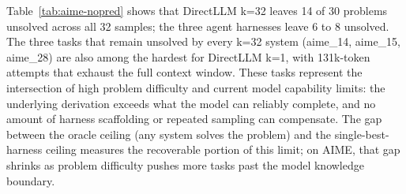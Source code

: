 Table~\ref{tab:aime-nopred} shows that DirectLLM k=32 leaves 14 of 30
problems unsolved across all 32 samples; the three agent harnesses leave
6 to 8 unsolved.
The three tasks that remain unsolved by every k=32 system (aime\_14,
aime\_15, aime\_28) are also among the hardest for DirectLLM k=1, with
131k-token attempts that exhaust the full context window.
These tasks represent the intersection of high problem difficulty and current
model capability limits: the underlying derivation exceeds what the model can
reliably complete, and no amount of harness scaffolding or repeated sampling
can compensate.
The gap between the oracle ceiling (any system solves the problem) and the
single-best-harness ceiling measures the recoverable portion of this limit;
on AIME, that gap shrinks as problem difficulty pushes more tasks past the
model knowledge boundary.
